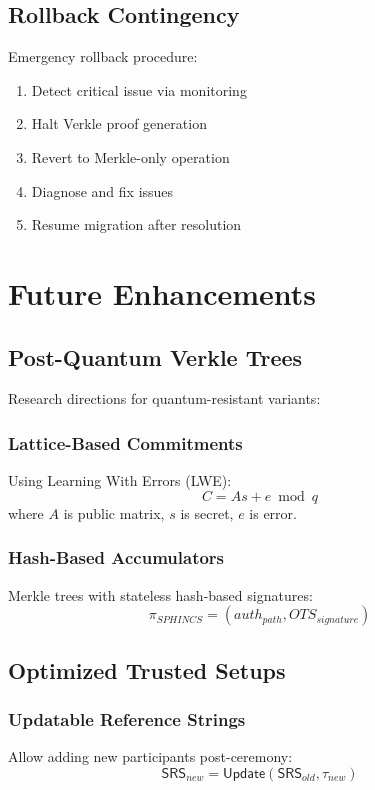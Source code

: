 \documentclass[11pt,a4paper]{article}
\theoremstyle{definition}
\begin{document}
\subsection{Rollback Contingency}

Emergency rollback procedure:
\begin{enumerate}
    \item Detect critical issue via monitoring
    \item Halt Verkle proof generation
    \item Revert to Merkle-only operation
    \item Diagnose and fix issues
    \item Resume migration after resolution
\end{enumerate}

\section{Future Enhancements}

\subsection{Post-Quantum Verkle Trees}

Research directions for quantum-resistant variants:

\subsubsection{Lattice-Based Commitments}
Using Learning With Errors (LWE):
\begin{equation}
    C = As + e \bmod q
\end{equation}
where $A$ is public matrix, $s$ is secret, $e$ is error.

\subsubsection{Hash-Based Accumulators}
Merkle trees with stateless hash-based signatures:
\begin{equation}
    \pi_{SPHINCS} = (auth_{path}, OTS_{signature})
\end{equation}

\subsection{Optimized Trusted Setups}

\subsubsection{Updatable Reference Strings}
Allow adding new participants post-ceremony:
\begin{equation}
    \mathsf{SRS}_{new} = \mathsf{Update}(\mathsf{SRS}_{old}, \tau_{new})
\end{equation}
\end{document}
